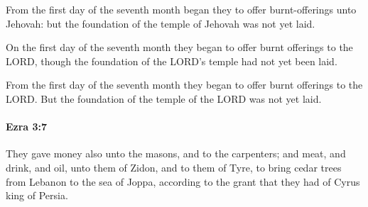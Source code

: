 			\begin{versebox}
					\item[BHS] 
					\item[LXX] 
					\item[ASV] From the first day of the seventh month began they to offer burnt-offerings unto Jehovah: but the foundation of the temple of Jehovah was not yet laid.
					\item[NIV] On the first day of the seventh month they began to offer burnt offerings to the LORD, though the foundation of the LORD’s temple had not yet been laid.
					\item[NRSV] From the first day of the seventh month they began to offer burnt offerings to the LORD. But the foundation of the temple of the LORD was not yet laid.
			\end{versebox}

		\paragraph{Ezra 3:7} %
			\label{EZRA-3-7}

			They gave money also unto the masons, and to the carpenters; and meat, and drink, and oil, unto them of Zidon, and to them of Tyre, to bring cedar trees from Lebanon to the sea of Joppa, according to the grant that they had of Cyrus king of Persia.


